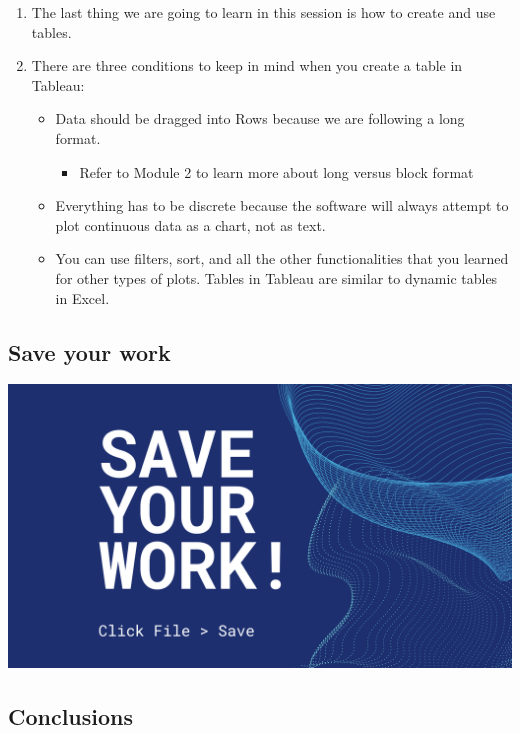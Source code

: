 \documentclass[
]{book}
\providecommand{\tightlist}{%
  \setlength{\itemsep}{0pt}\setlength{\parskip}{0pt}}
\begin{document}
\begin{enumerate}
\def\labelenumi{\arabic{enumi}.}
\tightlist
\item
  The last thing we are going to learn in this session is how to create and use tables.
\item
  There are three conditions to keep in mind when you create a table in Tableau:

  \begin{itemize}
  \tightlist
  \item
    Data should be dragged into Rows because we are following a long format.

    \begin{itemize}
    \tightlist
    \item
      Refer to Module 2 to learn more about long versus block format
    \end{itemize}
  \item
    Everything has to be discrete because the software will always attempt to plot continuous data as a chart, not as text.
  \item
    You can use filters, sort, and all the other functionalities that you learned for other types of plots. Tables in Tableau are similar to dynamic tables in Excel.
  \end{itemize}
\end{enumerate}

\hypertarget{save-your-work}{%
\subsection{Save your work}\label{save-your-work}}

\includegraphics{images/M3S3-save-work.png}

\hypertarget{conclusions}{%
\subsection{Conclusions}\label{conclusions}}
\end{document}
